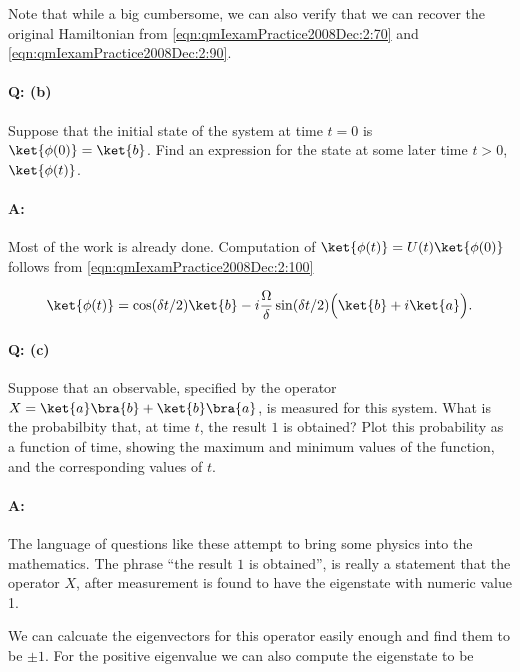 Note that while a big cumbersome, we can also verify that we can recover the original Hamiltonian from \ref{eqn:qmIexamPractice2008Dec:2:70} and \ref{eqn:qmIexamPractice2008Dec:2:90}.

\paragraph{Q: (b)}

Suppose that the initial state of the system at time $t = 0$ is $\ket{\phi(0)}= \ket{b}$.  Find an expression for the state at some later time $t > 0$, $\ket{\phi(t)}$.

\paragraph{A:}

Most of the work is already done.  Computation of $\ket{\phi(t)} = U(t) \ket{\phi(0)}$ follows from \ref{eqn:qmIexamPractice2008Dec:2:100}

\begin{equation}\label{eqn:qmIexamPractice2008Dec:2:110}
\ket{\phi(t)} =
\cos(\delta t/2) \ket{b}
- i \frac{\Omega}{\delta} \sin(\delta t/2) \Bigl( 
\ket{b} +i \ket{a}
\Bigr).
\end{equation}

\paragraph{Q: (c)}

Suppose that an observable, specified by the operator $X = 
\ket{a}\bra{b}
+ \ket{b}\bra{a}$, is measured for this system.  What is the probabilbity that, at time $t$, the result $1$ is obtained?  Plot this probability as a function of time, showing the maximum and minimum values of the function, and the corresponding values of $t$.

\paragraph{A:}

The language of questions like these attempt to bring some physics into the mathematics.  The phrase ``the result $1$ is obtained'', is really a statement that the operator $X$, after measurement is found to have the eigenstate with numeric value 1.

We can calcuate the eigenvectors for this operator easily enough and find them to be $\pm 1$.  For the positive eigenvalue we can also compute the eigenstate to be

